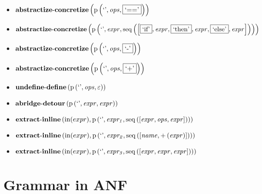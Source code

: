 {\begin{itemize}
\item $\mathbf{abstractize\text{-}concretize}\\\left(\mathrm{p}\left(\text{`'},\mathit{ops},\fbox{$\text{`=='}$}\right)\right)$
\item $\mathbf{abstractize\text{-}concretize}\\\left(\mathrm{p}\left(\text{`'},\mathit{expr},\mathrm{seq}\left(\left[\fbox{$\text{`if'}$}, \mathit{expr}, \fbox{$\text{`then'}$}, \mathit{expr}, \fbox{$\text{`else'}$}, \mathit{expr}\right]\right)\right)\right)$
\item $\mathbf{abstractize\text{-}concretize}\\\left(\mathrm{p}\left(\text{`'},\mathit{ops},\fbox{$\text{`-'}$}\right)\right)$
\item $\mathbf{abstractize\text{-}concretize}\\\left(\mathrm{p}\left(\text{`'},\mathit{ops},\fbox{$\text{`+'}$}\right)\right)$
\item $\mathbf{undefine\text{-}define}\\\left(\mathrm{p}\left(\text{`'},\mathit{ops},\varepsilon\right)\right)$
\item $\mathbf{abridge\text{-}detour}\\\left(\mathrm{p}\left(\text{`'},\mathit{expr},\mathit{expr}\right)\right)$
\item $\mathbf{extract\text{-}inline}\left(\mathrm{in}(expr),\\\mathrm{p}\left(\text{`'},\mathit{expr_1},\mathrm{seq}\left(\left[\mathit{expr}, \mathit{ops}, \mathit{expr}\right]\right)\right)\right)$
\item $\mathbf{extract\text{-}inline}\left(\mathrm{in}(expr),\\\mathrm{p}\left(\text{`'},\mathit{expr_2},\mathrm{seq}\left(\left[\mathit{name}, {+}\left(\mathit{expr}\right)\right]\right)\right)\right)$
\item $\mathbf{extract\text{-}inline}\left(\mathrm{in}(expr),\\\mathrm{p}\left(\text{`'},\mathit{expr_3},\mathrm{seq}\left(\left[\mathit{expr}, \mathit{expr}, \mathit{expr}\right]\right)\right)\right)$
\end{itemize}}

\section{Grammar in ANF}

